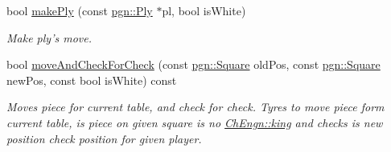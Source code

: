 \begin{DoxyCompactItemize}
bool \hyperlink{classChEngn_1_1Engine_a66f202e6cd42b2eeff43c8d58fe9ce38}{makePly} (const \hyperlink{classpgn_1_1Ply}{pgn::Ply} $\ast$pl, bool isWhite)
\begin{DoxyCompactList}\small\item\em Make ply's move. \item\end{DoxyCompactList}\item 
bool \hyperlink{classChEngn_1_1Engine_a743f59a5351f46d39888ca50b7329920}{moveAndCheckForCheck} (const \hyperlink{classpgn_1_1Square}{pgn::Square} oldPos, const \hyperlink{classpgn_1_1Square}{pgn::Square} newPos, const bool isWhite) const 
\begin{DoxyCompactList}\small\item\em Moves piece for current table, and check for check. Tyres to move piece form current table, is piece on given square is no \hyperlink{namespaceChEngn_a40c2dbaf0963b46704f08ffb28364cea}{ChEngn::king} and checks is new position check position for given player. \item\end{DoxyCompactList}\end{DoxyCompactItemize}
